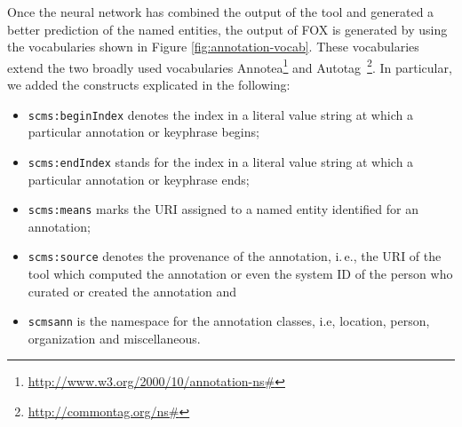 \documentclass[a4paper,twoside,bibtotoc,abstracton,12pt,BCOR=15mm]{article}
\begin{document}
Once the neural network has combined the output of the tool and generated a better prediction of the named entities, the output of FOX is generated by using the vocabularies shown in Figure \ref{fig:annotation-vocab}.
These vocabularies extend the two broadly used vocabularies Annotea\footnote{\url{http://www.w3.org/2000/10/annotation-ns#}} and Autotag~\footnote{\url{http://commontag.org/ns#}}. In particular, we added the constructs explicated in the following:
\begin{itemize}
    \item \texttt{scms:beginIndex} denotes the index in a literal value string at which a particular annotation or keyphrase begins;
    \item \texttt{scms:endIndex} stands for the index in a literal value string at which a particular annotation or keyphrase ends;
    \item \texttt{scms:means} marks the URI assigned to a named entity identified for an annotation;
    \item \texttt{scms:source} denotes the provenance of the annotation, i.\,e., the URI of the tool which computed the annotation or even the system ID of the person who curated or created the annotation and
		\item \texttt{scmsann} is the namespace for the annotation classes, i.e, location, person, organization and miscellaneous.
\end{itemize}
\end{document}
